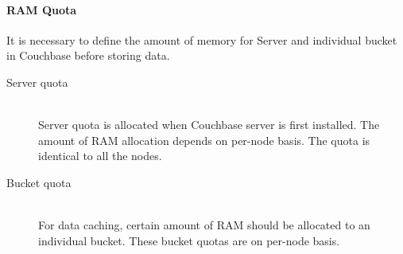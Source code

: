\paragraph{RAM Quota}
It is necessary to define the amount of memory for Server and individual bucket in Couchbase before storing data. 
\begin{description}
\item[Server quota] \hfill \\
          Server quota is allocated when Couchbase server is first installed. The amount of RAM allocation depends on per-node basis. The quota is identical to all the nodes.

\item[Bucket quota] \hfill \\   
For data caching, certain amount of RAM should be allocated to an individual bucket. These bucket quotas are on per-node basis. 

\end{description}
           
